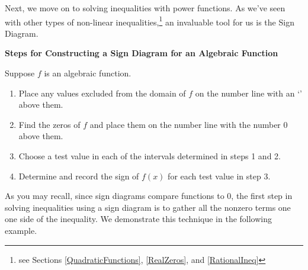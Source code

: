 Next, we move on to solving inequalities with power functions.  As we've seen with other types of non-linear inequalities,\footnote{see Sections \ref{QuadraticFunctions}, \ref{RealZeros}, and \ref{RationalIneq}} an invaluable tool for us is the Sign Diagram.

\label{algebraicsigndiagram}

\colorbox{ResultColor}{\bbm

\centerline{\textbf{Steps for Constructing a Sign Diagram for an Algebraic Function}} 

\medskip

\hspace{.17in} Suppose $f$ is an algebraic function. 

\begin{enumerate}

\item  Place any values excluded from the domain of  $f$ on the number line with an `\textinterrobang' above them.

\item  Find the zeros of $f$ and place them on the number line with the number $0$ above them.

\item  Choose a test value in each of the intervals determined in steps 1 and 2.

\item  Determine and record the sign of $f(x)$ for each test value in step 3.

\end{enumerate}

\ebm}


As you may recall, since sign diagrams compare functions to $0$, the first step in solving inequalities using a sign diagram is to gather all the nonzero terms one one side of the inequality.  We demonstrate this technique in the following example.


